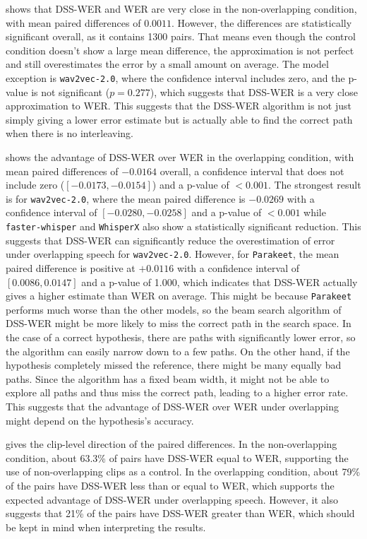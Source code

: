  shows that DSS-WER and WER are very close in the non-overlapping condition, with mean paired differences of $0.0011$. However, the differences are statistically significant overall, as it contains 1300 pairs. That means even though the control condition doesn't show a large mean difference, the approximation is not perfect and still overestimates the error by a small amount on average. The model exception is \texttt{wav2vec-2.0}, where the confidence interval includes zero, and the p-value is not significant ($p=0.277$), which suggests that DSS-WER is a very close approximation to WER. This suggests that the DSS-WER algorithm is not just simply giving a lower error estimate but is actually able to find the correct path when there is no interleaving. 

 shows the advantage of DSS-WER over WER in the overlapping condition, with mean paired differences of $-0.0164$ overall, a confidence interval that does not include zero ($[-0.0173, -0.0154]$) and a p-value of $<0.001$. The strongest result is for \texttt{wav2vec-2.0}, where the mean paired difference is $-0.0269$ with a confidence interval of $[-0.0280, -0.0258]$ and a p-value of $<0.001$ while \texttt{faster-whisper} and \texttt{WhisperX} also show a statistically significant reduction. This suggests that DSS-WER can significantly reduce the overestimation of error under overlapping speech for \texttt{wav2vec-2.0}. However, for \texttt{Parakeet}, the mean paired difference is positive at $+0.0116$ with a confidence interval of $[0.0086, 0.0147]$ and a p-value of 1.000, which indicates that DSS-WER actually gives a higher estimate than WER on average. This might be because \texttt{Parakeet} performs much worse than the other models, so the beam search algorithm of DSS-WER might be more likely to miss the correct path in the search space. In the case of a correct hypothesis, there are paths with significantly lower error, so the algorithm can easily narrow down to a few paths. On the other hand, if the hypothesis completely missed the reference, there might be many equally bad paths. Since the algorithm has a fixed beam width, it might not be able to explore all paths and thus miss the correct path, leading to a higher error rate. This suggests that the advantage of DSS-WER over WER under overlapping might depend on the hypothesis's accuracy.

 gives the clip-level direction of the paired differences. In the non-overlapping condition, about 63.3\% of pairs have DSS-WER equal to WER, supporting the use of non-overlapping clips as a control. In the overlapping condition, about 79\% of the pairs have DSS-WER less than or equal to WER, which supports the expected advantage of DSS-WER under overlapping speech. However, it also suggests that 21\% of the pairs have DSS-WER greater than WER, which should be kept in mind when interpreting the results.

